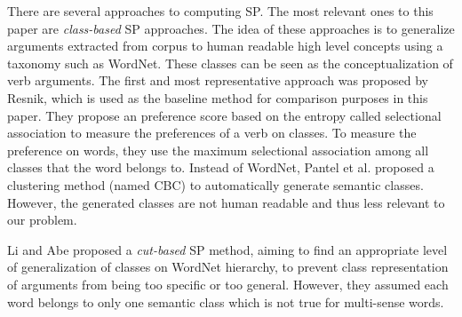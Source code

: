 There are several approaches to computing SP.
The most relevant ones to this paper are {\em class-based} SP approaches.
The idea of these approaches is to
generalize arguments extracted from corpus to human readable
high level concepts using a taxonomy such as WordNet\cite{wordnet}.
These classes can be seen as the conceptualization of verb arguments.
The first and most representative approach was proposed
by Resnik\cite{resnik1996selectional},
which is used as the baseline method for comparison purposes in this
paper.
They propose an preference score based on the entropy
called selectional association to measure the preferences
of a verb on classes. To measure the preference on words,
they use the maximum selectional association among
all classes that the word belongs to.
Instead of WordNet,
Pantel et al.\cite{pantel2003clustering}
proposed a clustering method (named CBC) to
automatically generate semantic classes. However, 
the generated classes are not human readable and thus 
less relevant to our problem.

Li and Abe\cite{li1998generalizing} proposed a {\em cut-based} SP method,
aiming to find an appropriate level of generalization of classes
on WordNet hierarchy, to prevent class representation of arguments
from being too specific or too general. However, they assumed each word 
belongs to only one semantic class which is not true for multi-sense words.

